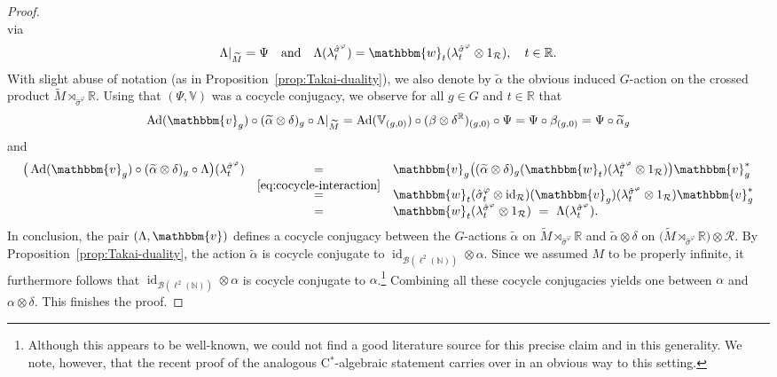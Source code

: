 \documentclass[11pt,a4paper]{article}
\theoremstyle{definition}
\theoremstyle{remark}
\numberwithin{equation}{section}
\numberwithin{theorem}{section}
\newcommand{\N}{\mathbb{N}}
\renewcommand{\tilde}{\widetilde}
\newcommand{\cstar}{C$^*$}
\begin{document}
\begin{proof}
\[\]
via
\[
\Lambda|_{\tilde{M}} = \Psi \quad\text{and}\quad \Lambda(\lambda^{\hat{\sigma}^\varphi}_t)=\mathbbm{w}_t(\lambda^{\hat{\sigma}^\varphi}_t\otimes 1_{\mathcal R}),\quad t\in\mathbb R.
\]
With slight abuse of notation (as in Proposition~\ref{prop:Takai-duality}), we also denote by $\tilde{\alpha}$ the obvious induced $G$-action on the crossed product $\tilde{M}\rtimes_{\hat{\sigma}^\varphi}\mathbb R$.
Using that $(\Psi,\mathbb{V})$ was a cocycle conjugacy, we observe for all $g\in G$ and $t\in\mathbb{R}$ that 
\[
\operatorname{Ad}(\mathbbm{v}_g)\circ(\tilde{\alpha}\otimes\delta)_g\circ\Lambda|_{\tilde{M}} = \operatorname{Ad}(\mathbb{V}_{(g,0)})\circ(\beta\otimes\delta^{\mathbb R})_{(g,0)}\circ\Psi=\Psi\circ\beta_{(g,0)}=\Psi\circ\tilde{\alpha}_g
\]
and
\[
\begin{array}{ccl}
\big( \operatorname{Ad}(\mathbbm{v}_g)\circ(\tilde{\alpha}\otimes\delta)_g\circ\Lambda \big)(\lambda^{\hat{\sigma}^\varphi}_t) 
&=& \mathbbm{v}_g \big( (\tilde{\alpha}\otimes\delta)_g(\mathbbm{w}_t) (\lambda^{\hat{\sigma}^\varphi}_t\otimes 1_{\mathcal R}) \big) \mathbbm{v}_g^* \\
&\stackrel{\eqref{eq:cocycle-interaction}}{=}& \mathbbm{w}_t(\hat{\sigma}^\varphi_t\otimes\operatorname{id}_{\mathcal R})(\mathbbm{v}_g) (\lambda^{\hat{\sigma}^\varphi}_t\otimes 1_{\mathcal R}) \mathbbm{v}_g^* \\
&=& \mathbbm{w}_t(\lambda^{\hat{\sigma}^\varphi}_t\otimes 1_{\mathcal R}) \ = \ \Lambda(\lambda^{\hat{\sigma}^\varphi}_t).
\end{array}
\]
In conclusion, the pair $(\Lambda,\mathbbm{v})$ defines a cocycle conjugacy between the $G$-actions $\tilde{\alpha}$ on $\tilde{M}\rtimes_{\hat{\sigma}^\varphi}\mathbb R$ and $\tilde{\alpha}\otimes\delta$ on $\big(\tilde{M}\rtimes_{\hat{\sigma}^\varphi}\mathbb R\big)\otimes\mathcal R$.
By Proposition~\ref{prop:Takai-duality}, the action $\tilde{\alpha}$ is cocycle conjugate to $\operatorname{id}_{\mathcal B(\ell^2(\N))}\otimes\alpha$.
Since we assumed $M$ to be properly infinite, it furthermore follows that $\operatorname{id}_{\mathcal B(\ell^2(\N))}\otimes\alpha$ is cocycle conjugate to $\alpha$.\footnote{Although this appears to be well-known, we could not find a good literature source for this precise claim and in this generality. We note, however, that the recent proof of the analogous \cstar-algebraic statement \cite[Proposition 1.4]{GabeSzabo22kp} carries over in an obvious way to this setting.}
Combining all these cocycle conjugacies yields one between $\alpha$ and $\alpha\otimes\delta$.
This finishes the proof.
\end{proof}
\end{document}
